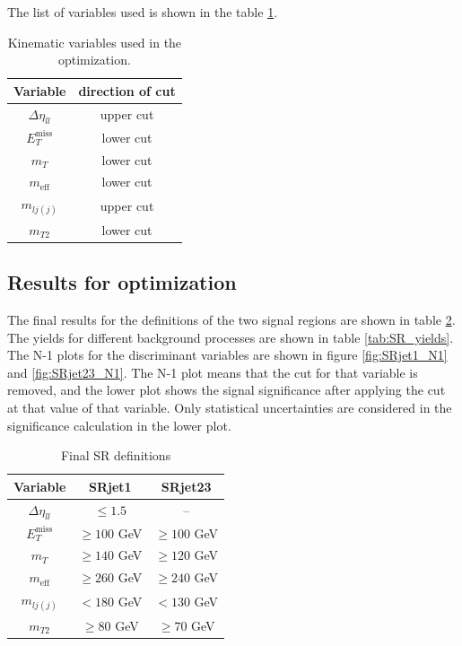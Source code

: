 The list of variables used is shown in the table \ref{tab:variables_optimization}.

\begin{table}[htbp]
\centering
\begin{tabular}{|c|c|}
\hline
Variable & direction of cut \\
\hline
\hline
$\Delta \eta_{ll}$ & upper cut \\
\hline
$E_T^{\text{miss}}$ & lower cut \\
\hline
$m_T$ & lower cut \\
\hline
$m_{\text{eff}}$ & lower cut \\
\hline
$m_{lj(j)}$ & upper cut \\
\hline
$m_{T2}$ & lower cut \\
\hline
\end{tabular}
\caption{Kinematic variables used in the optimization.}
\label{tab:variables_optimization}
\end{table}

\subsection{Results for optimization}
The final results for the definitions of the two signal regions are shown in table \ref{tab:SR_Def}.
The yields for different background processes are shown in table \ref{tab:SR_yields}.
The N-1 plots for the discriminant variables are shown in figure \ref{fig:SRjet1_N1} and \ref{fig:SRjet23_N1}.
The N-1 plot means that the cut for that variable is removed, and the lower plot shows the signal significance after applying the cut at that value of that variable.
Only statistical uncertainties are considered in the significance calculation in the lower plot.

\begin{table}[htpb]
\centering
\begin{tabular}{|c|c|c|}
\hline
Variable &  SRjet1 & SRjet23 \\ \hline
$\Delta\eta_{ll}$ & $\leq 1.5$ &  -- \\
$E_T^{\text{miss}}$ &  $\geq 100 $ GeV  & $\geq 100$ GeV\\
$m_T$ & $\geq 140$ GeV & $\geq 120$ GeV \\
$m_{\text{eff}}$ & $\geq 260$ GeV &  $\geq 240$ GeV\\
$m_{lj(j)}$ & $< 180$ GeV &  $< 130$ GeV\\
$m_{T2}$ & $\geq 80$ GeV&  $\geq 70$ GeV \\
\hline
\end{tabular}
\caption{Final SR definitions}
\label{tab:SR_Def}
\end{table}

